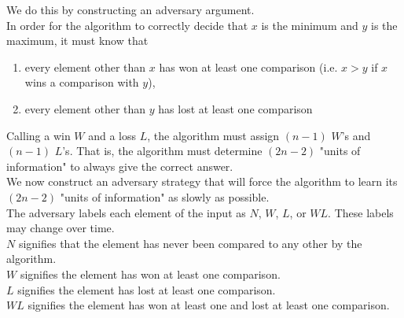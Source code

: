 \documentclass[12pt]{article}
\theoremstyle{plain}
\theoremstyle{definition}
\newcommand{\lecture}[1]{\marginpar{{\footnotesize $\leftarrow$ \underline{#1}}}}
\begin{document}
We do this by constructing an adversary argument. \\

In order for the algorithm to correctly decide that $x$ is the minimum and $y$ is the maximum, it must know that
\begin{enumerate}
  \item every element other than $x$ has won at least one comparison (i.e. $x > y$ if $x$ wins a comparison with $y$),
  \item every element other than $y$ has lost at least one comparison
\end{enumerate}
Calling a win $W$ and a loss $L$, the algorithm must assign $(n - 1)$ $W$'s and $(n - 1)$ $L$'s.
That is, the algorithm must determine $(2n - 2)$ "units of information" to always give the correct answer. \\

We now construct an adversary strategy that will force the algorithm to learn its $(2n - 2)$ "units of information" as slowly as possible. \\
The adversary labels each element of the input as $N$, $W$, $L$, or $WL$.
These labels may change over time. \\
$N$ signifies that the element has never been compared to any other by the algorithm. \\
$W$ signifies the element has won at least one comparison. \\
$L$ signifies the element has lost at least one comparison. \\
$WL$ signifies the element has won at least one and lost at least one comparison. \\

\lecture{2016/10/27}
\end{document}
